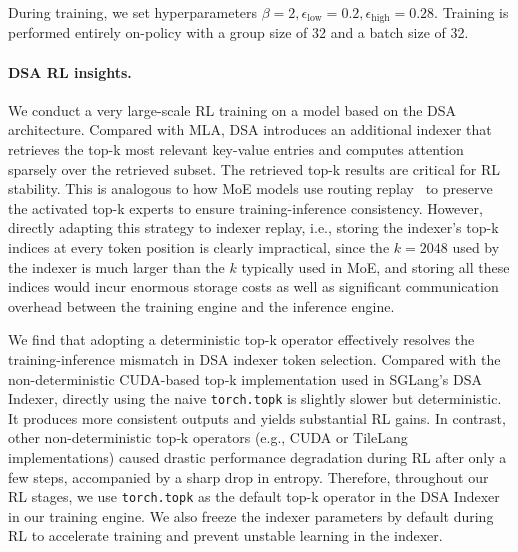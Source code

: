 \documentclass{article}
\theoremstyle{definition}
\begin{document}
During training, we set hyperparameters $\beta=2, \epsilon_{\text{low}}=0.2, \epsilon_{\text{high}}=0.28$. Training is performed entirely on-policy with a group size of 32 and a batch size of 32.

\paragraph{DSA RL insights.}
We conduct a very large-scale RL training on a model based on the DSA architecture. Compared with MLA, DSA introduces an additional indexer that retrieves the top-k most relevant key-value entries and computes attention sparsely over the retrieved subset.
The retrieved top-k results are critical for RL stability. This is analogous to how MoE models use routing replay~\cite{zheng2025group} to preserve the activated top-k experts to ensure training-inference consistency.
However, directly adapting this strategy to indexer replay, i.e., storing the indexer’s top-k indices at every token position is clearly impractical, since the $k = 2048$ used by the indexer is much larger than the $k$ typically used in MoE, and storing all these indices would incur enormous storage costs as well as significant communication overhead between the training engine and the inference engine.

We find that adopting a deterministic top-k operator effectively resolves the training-inference mismatch in DSA indexer token selection. Compared with the non-deterministic CUDA-based top‑k implementation used in SGLang’s DSA Indexer, directly using the naive \texttt{torch.topk} is slightly slower but deterministic. It produces more consistent outputs and yields substantial RL gains. In contrast, other non-deterministic top‑k operators (e.g., CUDA or TileLang implementations) caused drastic performance degradation during RL after only a few steps, accompanied by a sharp drop in entropy. Therefore, throughout our RL stages, we use \texttt{torch.topk} as the default top-k operator in the DSA Indexer in our training engine. We also freeze the indexer parameters by default during RL to accelerate training and prevent unstable learning in the indexer.
\end{document}
